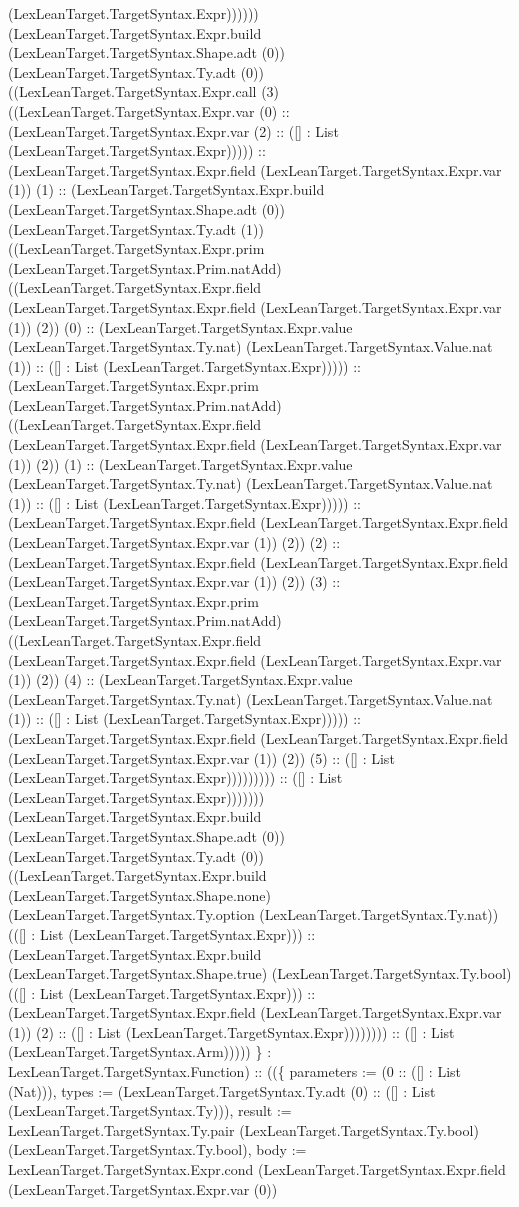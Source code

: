 \documentclass[11pt]{article}
\begin{document}
(LexLeanTarget.TargetSyntax.Expr)))))) (LexLeanTarget.TargetSyntax.Expr.build (LexLeanTarget.TargetSyntax.Shape.adt (0)) (LexLeanTarget.TargetSyntax.Ty.adt (0)) ((LexLeanTarget.TargetSyntax.Expr.call (3) ((LexLeanTarget.TargetSyntax.Expr.var (0) :: (LexLeanTarget.TargetSyntax.Expr.var (2) :: ([] : List (LexLeanTarget.TargetSyntax.Expr))))) :: (LexLeanTarget.TargetSyntax.Expr.field (LexLeanTarget.TargetSyntax.Expr.var (1)) (1) :: (LexLeanTarget.TargetSyntax.Expr.build (LexLeanTarget.TargetSyntax.Shape.adt (0)) (LexLeanTarget.TargetSyntax.Ty.adt (1)) ((LexLeanTarget.TargetSyntax.Expr.prim (LexLeanTarget.TargetSyntax.Prim.natAdd) ((LexLeanTarget.TargetSyntax.Expr.field (LexLeanTarget.TargetSyntax.Expr.field (LexLeanTarget.TargetSyntax.Expr.var (1)) (2)) (0) :: (LexLeanTarget.TargetSyntax.Expr.value (LexLeanTarget.TargetSyntax.Ty.nat) (LexLeanTarget.TargetSyntax.Value.nat (1)) :: ([] : List (LexLeanTarget.TargetSyntax.Expr))))) :: (LexLeanTarget.TargetSyntax.Expr.prim (LexLeanTarget.TargetSyntax.Prim.natAdd) ((LexLeanTarget.TargetSyntax.Expr.field (LexLeanTarget.TargetSyntax.Expr.field (LexLeanTarget.TargetSyntax.Expr.var (1)) (2)) (1) :: (LexLeanTarget.TargetSyntax.Expr.value (LexLeanTarget.TargetSyntax.Ty.nat) (LexLeanTarget.TargetSyntax.Value.nat (1)) :: ([] : List (LexLeanTarget.TargetSyntax.Expr))))) :: (LexLeanTarget.TargetSyntax.Expr.field (LexLeanTarget.TargetSyntax.Expr.field (LexLeanTarget.TargetSyntax.Expr.var (1)) (2)) (2) :: (LexLeanTarget.TargetSyntax.Expr.field (LexLeanTarget.TargetSyntax.Expr.field (LexLeanTarget.TargetSyntax.Expr.var (1)) (2)) (3) :: (LexLeanTarget.TargetSyntax.Expr.prim (LexLeanTarget.TargetSyntax.Prim.natAdd) ((LexLeanTarget.TargetSyntax.Expr.field (LexLeanTarget.TargetSyntax.Expr.field (LexLeanTarget.TargetSyntax.Expr.var (1)) (2)) (4) :: (LexLeanTarget.TargetSyntax.Expr.value (LexLeanTarget.TargetSyntax.Ty.nat) (LexLeanTarget.TargetSyntax.Value.nat (1)) :: ([] : List (LexLeanTarget.TargetSyntax.Expr))))) :: (LexLeanTarget.TargetSyntax.Expr.field (LexLeanTarget.TargetSyntax.Expr.field (LexLeanTarget.TargetSyntax.Expr.var (1)) (2)) (5) :: ([] : List (LexLeanTarget.TargetSyntax.Expr))))))))) :: ([] : List (LexLeanTarget.TargetSyntax.Expr))))))) (LexLeanTarget.TargetSyntax.Expr.build (LexLeanTarget.TargetSyntax.Shape.adt (0)) (LexLeanTarget.TargetSyntax.Ty.adt (0)) ((LexLeanTarget.TargetSyntax.Expr.build (LexLeanTarget.TargetSyntax.Shape.none) (LexLeanTarget.TargetSyntax.Ty.option (LexLeanTarget.TargetSyntax.Ty.nat)) (([] : List (LexLeanTarget.TargetSyntax.Expr))) :: (LexLeanTarget.TargetSyntax.Expr.build (LexLeanTarget.TargetSyntax.Shape.true) (LexLeanTarget.TargetSyntax.Ty.bool) (([] : List (LexLeanTarget.TargetSyntax.Expr))) :: (LexLeanTarget.TargetSyntax.Expr.field (LexLeanTarget.TargetSyntax.Expr.var (1)) (2) :: ([] : List (LexLeanTarget.TargetSyntax.Expr)))))))) :: ([] : List (LexLeanTarget.TargetSyntax.Arm))))) \} : LexLeanTarget.TargetSyntax.Function) :: ((\{ parameters := (0 :: ([] : List (Nat))), types := (LexLeanTarget.TargetSyntax.Ty.adt (0) :: ([] : List (LexLeanTarget.TargetSyntax.Ty))), result := LexLeanTarget.TargetSyntax.Ty.pair (LexLeanTarget.TargetSyntax.Ty.bool) (LexLeanTarget.TargetSyntax.Ty.bool), body := LexLeanTarget.TargetSyntax.Expr.cond (LexLeanTarget.TargetSyntax.Expr.field (LexLeanTarget.TargetSyntax.Expr.var (0)) 
\end{document}
